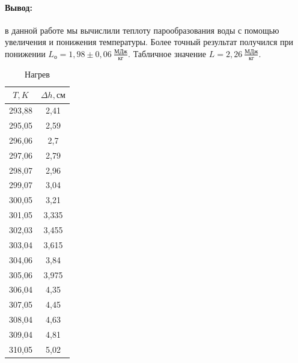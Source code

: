 \documentclass[a4paper,12pt]{article}
\begin{document}
\paragraph{Вывод:}в данной работе мы вычислили теплоту парообразования воды с помощью увеличения и понижения температуры. Более точный результат получился при понижении $L_{о}=1,98\pm 0,06~ \frac{МДж}{кг}$. Табличное значение $L=2,26~ \frac{МДж}{кг}$.\\
\begin{table}[h]
    \centering
    \begin{tabular}{|c|c|} \hline
    $T, K$ & $\Delta h, см$ \\ \hline
         293,88 & 2,41 \\ \hline
         295,05 & 2,59 \\ \hline
         296,06 & 2,7 \\ \hline
         297,06 & 2,79 \\ \hline
         298,07 & 2,96 \\ \hline
         299,07 & 3,04 \\ \hline
         300,05 & 3,21 \\ \hline
         301,05 & 3,335 \\ \hline
         302,03 & 3,455 \\ \hline
         303,04 & 3,615 \\ \hline
         304,06 & 3,84 \\ \hline
         305,06 & 3,975 \\ \hline
         306,04 & 4,35 \\ \hline
         307,05 & 4,45 \\ \hline
         308,04 & 4,63 \\ \hline
         309,04 & 4,81 \\ \hline
         310,05 & 5,02 \\ \hline
    \end{tabular}
    \caption{Нагрев}
    \label{tab:my_label}
\end{table}
\end{document}
